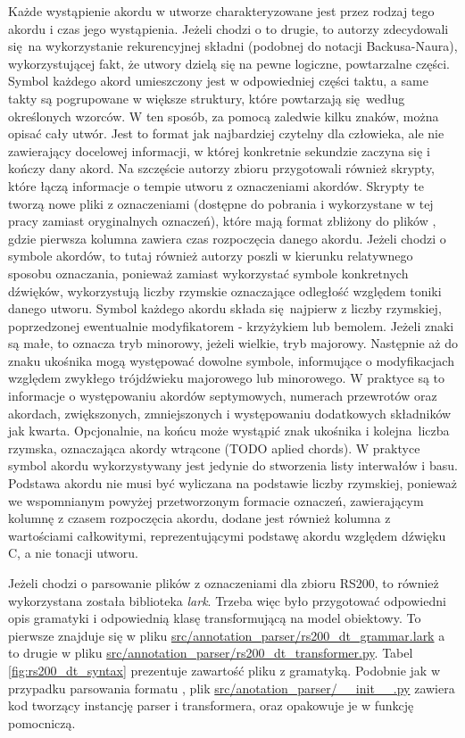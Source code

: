 Każde wystąpienie akordu w utworze charakteryzowane jest przez rodzaj tego akordu i czas jego
wystąpienia. Jeżeli chodzi o to drugie, to autorzy zdecydowali się na wykorzystanie rekurencyjnej
składni (podobnej do notacji Backusa-Naura), wykorzystującej fakt, że utwory dzielą się na pewne
logiczne, powtarzalne części. Symbol każdego akord umieszczony jest w odpowiedniej części taktu, a
same takty są pogrupowane w większe struktury, które powtarzają się według określonych wzorców. W
ten sposób, za pomocą zaledwie kilku znaków, można opisać cały utwór. Jest to format jak najbardziej
czytelny dla człowieka, ale nie zawierający docelowej informacji, w której konkretnie sekundzie
zaczyna się i kończy dany akord. Na szczęście autorzy zbioru przygotowali również skrypty, które
łączą informacje o tempie utworu z oznaczeniami akordów. Skrypty te tworzą nowe pliki z oznaczeniami
(dostępne do pobrania i wykorzystane w tej pracy zamiast oryginalnych oznaczeń), które mają format
zbliżony do plików , gdzie pierwsza kolumna zawiera czas rozpoczęcia danego akordu. Jeżeli
chodzi o symbole akordów, to tutaj również autorzy poszli w kierunku relatywnego sposobu oznaczania,
ponieważ zamiast wykorzystać symbole konkretnych dźwięków, wykorzystują liczby rzymskie oznaczające
odległość względem toniki danego utworu.  Symbol każdego akordu składa się najpierw z liczby
rzymskiej, poprzedzonej ewentualnie modyfikatorem - krzyżykiem lub bemolem. Jeżeli znaki są małe, to
oznacza tryb minorowy, jeżeli wielkie, tryb majorowy. Następnie aż do znaku ukośnika mogą występować
dowolne symbole, informujące o modyfikacjach względem zwykłego trójdźwieku majorowego lub
minorowego. W praktyce są to informacje o występowaniu akordów septymowych, numerach przewrotów oraz
akordach, zwiększonych, zmniejszonych i występowaniu dodatkowych składników jak kwarta. Opcjonalnie,
na końcu może wystąpić znak ukośnika i kolejna liczba rzymska, oznaczająca akordy wtrącone (TODO
aplied chords). W praktyce symbol akordu wykorzystywany jest jedynie do stworzenia listy interwałów
i basu.  Podstawa akordu nie musi być wyliczana na podstawie liczby rzymskiej, ponieważ we
wspomnianym powyżej przetworzonym formacie oznaczeń, zawierającym kolumnę z czasem rozpoczęcia
akordu, dodane jest również kolumna z wartościami całkowitymi, reprezentującymi podstawę akordu
względem dźwięku C, a nie tonacji utworu.

Jeżeli chodzi o parsowanie plików z oznaczeniami dla zbioru RS200, to również wykorzystana została
biblioteka \emph{lark}. Trzeba więc było przygotować odpowiedni opis gramatyki i odpowiednią klasę
transformującą na model obiektowy. To pierwsze znajduje się w pliku
\url{src/annotation\_parser/rs200\_dt\_grammar.lark} a to drugie w pliku
\url{src/annotation\_parser/rs200\_dt\_transformer.py}. Tabel \ref{fig:rs200_dt_syntax} prezentuje
zawartość pliku z gramatyką. Podobnie jak w przypadku parsowania formatu , plik
\url{src/anotation\_parser/\_\_init\_\_.py} zawiera kod tworzący instancję parser i transformera, oraz
opakowuje je w funkcję pomocniczą.

